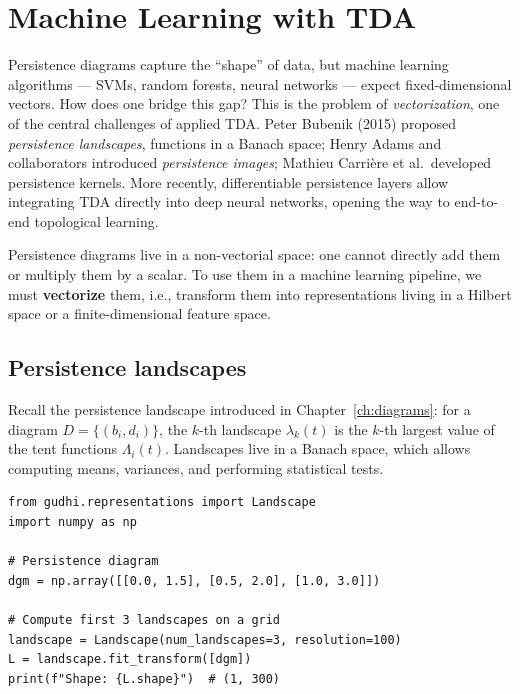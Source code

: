 \chapter{Machine Learning with TDA}
\label{ch:ml_tda}

Persistence diagrams capture the ``shape'' of data, but machine learning algorithms --- SVMs, random forests, neural networks --- expect fixed-dimensional vectors. How does one bridge this gap? This is the problem of \emph{vectorization}, one of the central challenges of applied TDA. Peter Bubenik (2015) proposed \emph{persistence landscapes}, functions in a Banach space; Henry Adams and collaborators introduced \emph{persistence images}; Mathieu Carri\`ere et al.\ developed persistence kernels. More recently, differentiable persistence layers allow integrating TDA directly into deep neural networks, opening the way to end-to-end topological learning.

\begin{intuition}
Persistence diagrams live in a non-vectorial space: one cannot
directly add them or multiply them by a scalar. To use them in
a machine learning pipeline, we must \textbf{vectorize}
them, i.e., transform them into representations living in a Hilbert
space or a finite-dimensional feature space.
\end{intuition}

\section{Persistence landscapes}
\label{sec:landscapes}

Recall the persistence landscape introduced in
Chapter~\ref{ch:diagrams}: for a diagram $D = \{(b_i, d_i)\}$, the
$k$-th landscape $\lambda_k(t)$ is the $k$-th largest value of the
tent functions $\Lambda_i(t)$. Landscapes live in a Banach space,
which allows computing means, variances, and performing statistical
tests.

\begin{verbatim}
from gudhi.representations import Landscape
import numpy as np

# Persistence diagram
dgm = np.array([[0.0, 1.5], [0.5, 2.0], [1.0, 3.0]])

# Compute first 3 landscapes on a grid
landscape = Landscape(num_landscapes=3, resolution=100)
L = landscape.fit_transform([dgm])
print(f"Shape: {L.shape}")  # (1, 300)
\end{verbatim}

